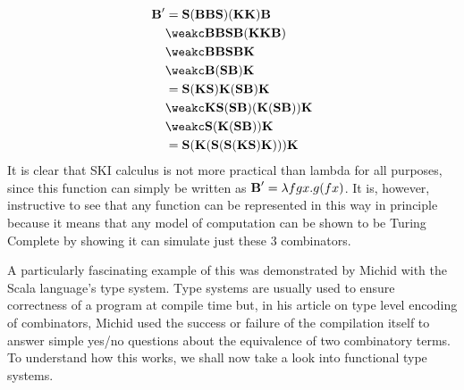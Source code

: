 \begin{align}
    \Bc'&=\Sc(\Bc\Bc\Sc)(\Kc\Kc)\Bc\\
    &\weakc\Bc\Bc\Sc\Bc(\Kc\Kc\Bc)\\
    &\weakc\Bc\Bc\Sc\Bc\Kc\\
    &\weakc\Bc(\Sc\Bc)\Kc\\
    &=\Sc(\Kc\Sc)\Kc(\Sc\Bc)\Kc\\
    &\weakc\Kc\Sc(\Sc\Bc)(\Kc(\Sc\Bc))\Kc\\
    &\weakc\Sc(\Kc(\Sc\Bc))\Kc\\
    &=\Sc(\Kc(\Sc(\Sc(\Kc\Sc)\Kc)))\Kc
\end{align}
It is clear that SKI calculus is not more practical than lambda for all purposes, since this function can simply be written as $\textbf B'=\lambda fgx.g(fx)$. It is, however, instructive to see that any function can be represented in this way in principle because it means that any model of computation can be shown to be Turing Complete by showing it can simulate just these 3 combinators.

A particularly fascinating example of this was demonstrated by Michid with the Scala language's type system\cite{ScalaTypeEncoding}. Type systems are usually used to ensure correctness of a program at compile time but, in his article on type level encoding of combinators, Michid used the success or failure of the compilation itself to answer simple yes/no questions about the equivalence of two combinatory terms. To understand how this works, we shall now take a look into functional type systems.


